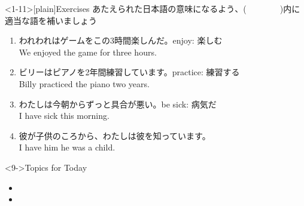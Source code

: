 \documentclass[aspectratio=169,xcolor={dvipsnames,table}]{beamer}
\newcommand{\myaudio}[1]{\href{#1}{\faVolumeUp}}
\begin{document}
\begin{frame}<1-11>[plain]{Exercises}
あたえられた日本語の意味になるよう、(~~~~~~~~)内に適当な語を補いましょう\mbox{}\hfill\myaudio{./audio/012_have_pp_keizoku_05.mp3}

\begin{enumerate}
 \item われわれはゲームをこの3時間楽しんだ。\hfill{}{\small enjoy: 楽しむ}\\
We  enjoyed the game for three hours. \item ビリーはピアノを2年間練習しています。\hfill{}{\small practice: 練習する}\\
Billy  practiced the piano  two years.
 \item わたしは今朝からずっと具合が悪い。\hfill{}{\small be sick: 病気だ}\\
I have  sick  this morning.
 \item 彼が子供のころから、わたしは彼を知っています。\\
I have  him  he was a child.
\end{enumerate}

\begin{exampleblock}<9->{Topics for Today}\small
\begin{itemize}
 \item {}
 \item {}

\end{itemize}
      \end{exampleblock}
\end{frame}
\end{document}
